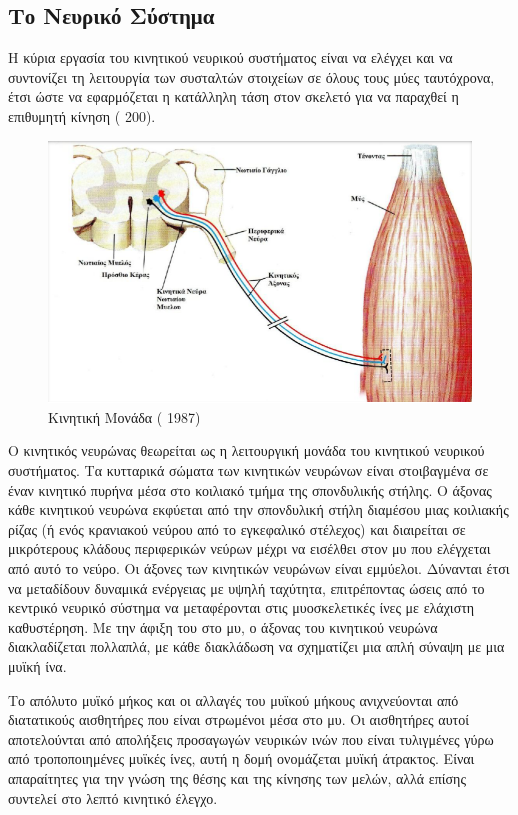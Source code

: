 \subsection{Το Νευρικό Σύστημα}

Η κύρια εργασία του κινητικού νευρικού συστήματος είναι να ελέγχει και να συντονίζει τη λειτουργία των συσταλτών στοιχείων σε όλους τους μύες ταυτόχρονα, έτσι ώστε να εφαρμόζεται η κατάλληλη τάση στον σκελετό για να παραχθεί η επιθυμητή κίνηση ( 200).

\begin{figure}[H]
    \centering
    \includegraphics[width=.8\textwidth]{neuromusculoskeletal/fig/muscle-fysiology4.png}
    \caption{Κινητική Μονάδα ( 1987)}
    \label{fig:muscle-fysiology4}
\end{figure}

Ο κινητικός νευρώνας θεωρείται ως η λειτουργική μονάδα του κινητικού νευρικού συστήματος. Τα κυτταρικά σώματα των κινητικών νευρώνων είναι στοιβαγμένα σε έναν κινητικό πυρήνα μέσα στο κοιλιακό τμήμα της σπονδυλικής στήλης. Ο άξονας κάθε κινητικού νευρώνα εκφύεται από την σπονδυλική στήλη διαμέσου μιας κοιλιακής ρίζας (ή ενός κρανιακού νεύρου από το εγκεφαλικό στέλεχος) και διαιρείται σε μικρότερους κλάδους περιφερικών νεύρων μέχρι να εισέλθει στον μυ που ελέγχεται από αυτό το νεύρο. Οι άξονες των κινητικών νευρώνων είναι εμμύελοι. Δύνανται έτσι να μεταδίδουν δυναμικά ενέργειας με υψηλή ταχύτητα, επιτρέποντας ώσεις από το κεντρικό νευρικό σύστημα να μεταφέρονται στις μυοσκελετικές ίνες με ελάχιστη καθυστέρηση. Με την άφιξη του στο μυ, ο άξονας του κινητικού νευρώνα διακλαδίζεται πολλαπλά, με κάθε διακλάδωση να σχηματίζει μια απλή σύναψη με μια μυϊκή ίνα.

Το απόλυτο μυϊκό μήκος και οι αλλαγές του μυϊκού μήκους ανιχνεύονται από διατατικούς αισθητήρες που είναι στρωμένοι μέσα στο μυ. Οι αισθητήρες αυτοί αποτελούνται από απολήξεις προσαγωγών νευρικών ινών που είναι τυλιγμένες γύρω από τροποποιημένες μυϊκές ίνες, αυτή η δομή ονομάζεται μυϊκή άτρακτος. Είναι απαραίτητες για την γνώση της θέσης και της κίνησης των μελών, αλλά επίσης συντελεί στο λεπτό κινητικό έλεγχο.

